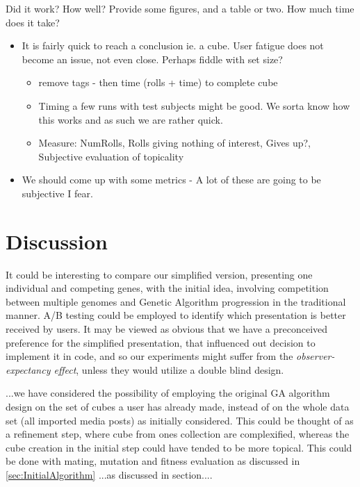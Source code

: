 \documentclass[]{article}
\begin{document}


\begin{framed}
Did it work? How well? Provide some figures, and a table or two. How much time does it take?
\end{framed}
\begin{itemize}		
\item It is fairly quick to reach a conclusion ie. a cube. User fatigue does not become an issue, not even close. Perhaps fiddle with set size?
	\begin{itemize}
	\item remove tags - then time (rolls + time) to complete cube
	\item Timing a few runs with test subjects might be good. We sorta know how this works and as such we are rather quick.
	\item Measure: NumRolls, Rolls giving nothing of interest, Gives up?, Subjective evaluation of topicality
	\end{itemize}
\item We should come up with some metrics - A lot of these are going to be subjective I fear.
\end{itemize}



\section{Discussion}
\label{sec:Discussion}

It could be interesting to compare our simplified version, presenting one individual and competing genes, with the initial idea, involving competition between multiple genomes and Genetic Algorithm progression in the traditional manner.  A/B testing could be employed to identify which presentation is better received by users.  It may be viewed as obvious that we have a preconceived preference for the simplified presentation, that influenced out decision to implement it in code, and so our experiments might suffer from the \textit{observer-expectancy effect}, unless they would utilize a double blind design.

...we have considered the possibility of employing the original GA algorithm design on the set of cubes a user has already made, instead of on the whole data set (all imported media posts) as initially considered.  This could be thought of as a refinement step, where cube from ones collection are complexified, whereas the cube creation in the initial step could have tended to be more topical.  This could be done with mating, mutation and fitness evaluation as discussed in \autoref{sec:InitialAlgorithm}  ...as discussed in section....
\end{document}
